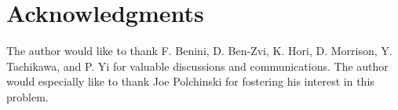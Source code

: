 \documentclass[12pt]{article}
\numberwithin{equation}{section}%
\theoremstyle{definition}
\begin{document}
\section*{Acknowledgments}
The author would like to thank F. Benini, D. Ben-Zvi, K. Hori, D. Morrison, Y. Tachikawa, and P. Yi for valuable discussions and communications.  The author would especially like to thank Joe Polchinski for fostering his interest in this problem.


\cleardoublepage %


\end{document}
